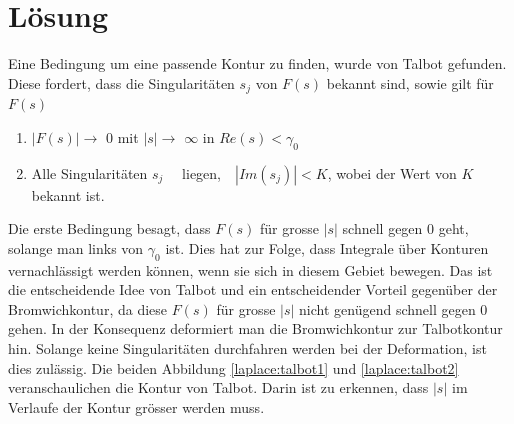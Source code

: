%
%
%


\section{Lösung}
\label{laplace:section:Methode nach Talbot}
Eine Bedingung um eine passende Kontur zu finden, wurde von Talbot gefunden.
Diese fordert, dass die Singularitäten $s_{j}$ von $F(s)$ bekannt sind, sowie gilt für $F(s)$
\begin{enumerate}
\item
$|F(s)|\rightarrow$ $0$ mit $|s|\rightarrow$ $\infty$ in $Re(s)<\gamma_{0}$
\item
Alle Singularitäten $s_{j}$~~ liegen,~~$|Im(s_{j})|<K$, wobei der Wert von $K$ bekannt ist.
\end{enumerate}

Die erste Bedingung besagt, dass $F(s)$ für grosse $|s|$ schnell gegen $0$ geht, solange man links von $\gamma_{0}$ ist. Dies hat zur Folge, dass Integrale über Konturen vernachlässigt werden können, wenn sie sich in diesem Gebiet bewegen. Das ist die entscheidende Idee von Talbot und ein entscheidender Vorteil gegenüber der Bromwichkontur, da diese $F(s)$ für grosse $|s|$ nicht genügend schnell gegen $0$ gehen. In der Konsequenz deformiert man die Bromwichkontur zur Talbotkontur hin. Solange keine Singularitäten durchfahren werden bei der Deformation, ist dies zulässig. Die beiden Abbildung \ref{laplace:talbot1} und \ref{laplace:talbot2} veranschaulichen die Kontur von Talbot. Darin ist zu erkennen, dass $|s|$ im Verlaufe der Kontur grösser werden muss. 

